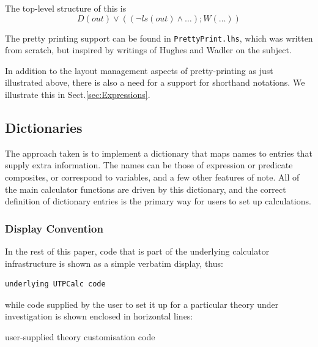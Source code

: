 \noindent
The top-level structure of this is
\[D(out) \lor ( (\lnot ls(out) \land \dots) ; W(\dots) )\]

\noindent
The pretty printing support can be found in \texttt{PrettyPrint.lhs},
which was written from scratch, but inspired by writings of
Hughes\cite{HughesJohn1995c} and Wadler\cite{wadler-pp}
on the subject.

In addition to the layout management aspects of pretty-printing
as just illustrated above,
there is also a need for a support for shorthand notations.
We illustrate this in Sect.\ref{sec:Expressions}.

\subsection{Dictionaries}\label{ssec:dict}

The approach taken is to implement a dictionary that maps names
to entries that supply extra information.
The names can be those of expression or predicate composites,
or correspond to variables, and a few other features of note.
All of the main calculator functions are driven by this
dictionary,
and the correct definition of dictionary entries
is the primary way for users to set up calculations.

%

\subsubsection{Display Convention}

In the rest of this paper, code that is part of the underlying
calculator infrastructure is shown as a simple verbatim display, thus:
\begin{verbatim}
underlying UTPCalc code
\end{verbatim}
while code supplied by the user to set it up for a particular
theory under investigation is shown enclosed in horizontal lines:
\begin{code}
user-supplied theory customisation code
\end{code}
